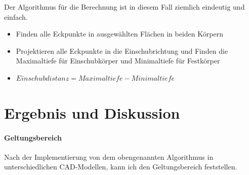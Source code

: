 \documentclass[14pt,a4paper,titlepage]{article}
\begin{document}
	 	Der Algorithmus für die Berechnung ist in diesem Fall ziemlich eindeutig und einfach.
	 		\begin{itemize}
	 			\item Finden alle Eckpunkte in ausgewählten Flächen in beiden Körpern
	 			\item Projektieren alle Eckpunkte in die Einschubrichtung und Finden die Maximaltiefe für Einschubkörper und Minimaltiefe für Festkörper
	 			\item \(Einschubdistanz = Maximaltiefe - Minimaltiefe\)
	 		\end{itemize}
	\section{Ergebnis und Diskussion}
		\paragraph{Geltungsbereich}
		Nach der Implementierung von dem obengenannten Algorithmus in unterschiedlichen CAD-Modellen, kann ich den Geltungsbereich feststellen.  
\end{document}
